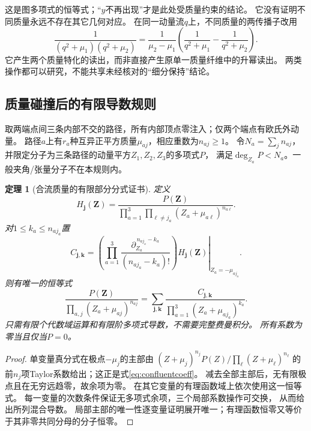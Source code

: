 \documentclass[11pt,a4paper]{ctexart}
\theoremstyle{cnplain}\newtheorem{theorem}{定理}[section]
\theoremstyle{definition}\newtheorem{definition}[theorem]{定义}
\theoremstyle{remark}\newtheorem{remark}[theorem]{注}
\begin{document}
这是图多项式的恒等式；“$y$不再出现”才是此处受质量约束的结论。
它没有证明不同质量永远不存在其它几何对应。
在同一动量流$q$上，不同质量的两传播子改用
\[
 \frac1{(q^2+\mu_1)(q^2+\mu_2)}
 =\frac1{\mu_2-\mu_1}
   \left(\frac1{q^2+\mu_1}-\frac1{q^2+\mu_2}\right).
\]
它产生两个质量特化的读出，而非直接产生原单一质量纤维中的升幂读出。
两类操作都可以研究，不能共享未经核对的“细分保持”结论。

\subsection{质量碰撞后的有限导数规则}
\label{subsec:confluenttheta}
取两端点间三条内部不交的路径，所有内部顶点零注入；仅两个端点有欧氏外动量。
路径$a$上有$r_a$种互异正平方质量$\mu_{aj}$，相应重数为$n_{aj}\ge1$。
令$N_a=\sum_j n_{aj}$，并限定分子为三条路径的动量平方$Z_1,Z_2,Z_3$的多项式$P$，
满足$\deg_{Z_a}P<N_a$。一般夹角/张量分子不在本规则内。
\begin{theorem}[合流质量的有限部分分式证书]\label{thm:confluentcertificate}
定义
\[
 H_{\boldsymbol j}(\boldsymbol Z)=
 \frac{P(\boldsymbol Z)}{
  \prod_{a=1}^3\prod_{\ell\ne j_a}(Z_a+\mu_{a\ell})^{n_{a\ell}}}.
\]
对$1\le k_a\le n_{aj_a}$置
\begin{equation}\label{eq:confluentcoeff}
 C_{\boldsymbol j,\boldsymbol k}=
 \left.
 \left(\prod_{a=1}^3
 \frac{\partial_{Z_a}^{\,n_{aj_a}-k_a}}{(n_{aj_a}-k_a)!}\right)
 H_{\boldsymbol j}(\boldsymbol Z)
 \right|_{Z_a=-\mu_{aj_a}}.
\end{equation}
则有唯一的恒等式
\begin{equation}\label{eq:confluentpartial}
 \frac{P(\boldsymbol Z)}{
       \prod_{a,j}(Z_a+\mu_{aj})^{n_{aj}}}
 =\sum_{\boldsymbol j,\boldsymbol k}
      \frac{C_{\boldsymbol j,\boldsymbol k}}
           {\prod_{a=1}^3(Z_a+\mu_{aj_a})^{k_a}}.
\end{equation}
只需有限个代数域运算和有限阶多项式导数，不需要完整费曼积分。
所有系数为零当且仅当$P=0$。
\end{theorem}
\begin{proof}
单变量真分式在极点$-\mu_j$的主部由
$(Z+\mu_j)^{n_j}P(Z)/\prod_\ell(Z+\mu_\ell)^{n_\ell}$
的前$n_j$项Taylor系数给出；这正是式\eqref{eq:confluentcoeff}。
减去全部主部后，无有限极点且在无穷远趋零，故余项为零。
在其它变量的有理函数域上依次使用这一恒等式。
每一变量的次数条件保证无多项式余项，三个局部系数操作可交换，
从而给出所列混合导数。
局部主部的唯一性逐变量证明展开唯一；有理函数恒零又等价于其非零共同分母的分子恒零。
\end{proof}
\end{document}

